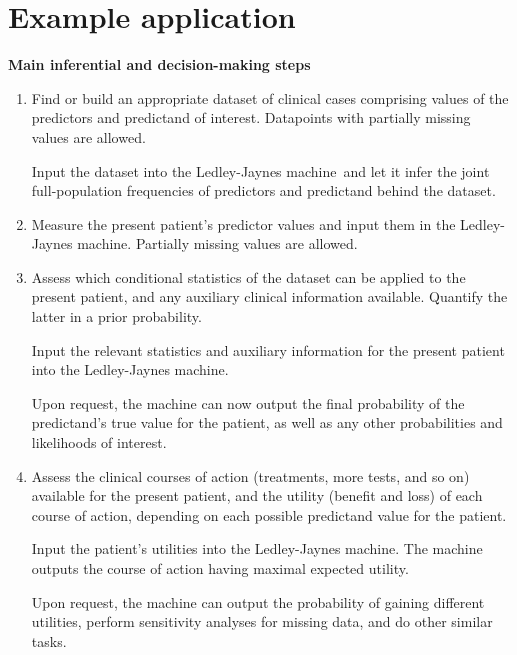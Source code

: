 \documentclass[utf8]{FrontiersinHarvard} %
\renewcommand*{\|}[1][]{\nonscript\:#1\vert\nonscript\:\mathopen{}}
\newcommand*{\ljm}{Ledley-Jaynes machine}
\begin{document}
\bigskip%
\section{Example application}
\label{sec:application}

\begin{table}[t]\centering
    \begin{framed}
      \small
      \caption{\small\bf Main inferential and decision-making steps}\label{tab:main_steps}
      \begin{enumerate}\itemsep1em
        \setcounter{enumi}{-1}
      \item\label{item:learn} Find or build an appropriate dataset of clinical cases comprising values of the predictors and predictand of interest. Datapoints with partially missing values are allowed.

        Input the dataset into the \ljm\ and let it infer the joint full-population frequencies of predictors and predictand behind the dataset.

      \item\label{item:predictors} Measure the present patient's predictor values and input them in the \ljm. Partially missing values are allowed.

      \item\label{item:population} Assess which conditional statistics of the dataset can be applied to the present patient, and any auxiliary clinical information available. Quantify the latter in a prior probability.

        Input the relevant statistics and auxiliary information for the present patient into the \ljm. 

        Upon request, the machine can now output the final probability of the predictand's true value for the patient, as well as any other probabilities and likelihoods of interest.
        
      \item\label{item:utilities} Assess the clinical courses of action (treatments, more tests, and so on) available for the present patient, and the utility (benefit and loss) of each course of action, depending on each possible predictand value for the patient.

        Input the patient's utilities into the \ljm. The machine outputs the course of action having maximal expected utility.

        Upon request, the machine can output the probability of gaining different utilities, perform sensitivity analyses for missing data, and do other similar tasks.
      \end{enumerate}
    \end{framed}
\end{table}
\end{document}
